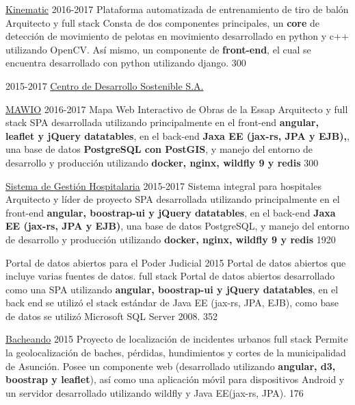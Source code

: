 \documentclass[]{friggeri-cv}
\begin{document}
\begin{entrylist}
{    \proyecto
        {\href{http://www.cds.com.py/productos/kinematics/}{Kinematic}}
        {2016-2017}
        {Plataforma automatizada de entrenamiento de tiro de balón}
        {Arquitecto y full stack}
        {Consta de dos componentes principales, un \textbf{core} de detección de movimiento de pelotas en movimiento desarrollado en python y c++ utilizando OpenCV. Así mismo, un componente de \textbf{front-end}, el cual se encuentra desarrollado con python utilizando django.}
        {300}
        
        
        
      }
      {}
   
  \entry
    {2015-2017}
    {\href{http://www.cds.com.py}{Centro de Desarrollo Sostenible S.A.}}
    {}
    {
    \proyecto
        {\href{https://mawio.net/}{MAWIO}}
        {2016-2017}
        {Mapa Web Interactivo de Obras de la Essap}
        {Arquitecto y full stack}
        {SPA desarrollada utilizando principalmente en el front-end \textbf{angular, leaflet y jQuery datatables}, en el back-end \textbf{Jaxa EE (jax-rs, JPA y EJB),}, una base de datos \textbf{PostgreSQL con PostGIS}, y manejo del entorno de desarrollo y producción utilizando \textbf{docker, nginx, wildfly 9 y redis}}
        {300}
        
    \proyecto
        {\href{http://www.cds.com.py/productos/sistemas-de-gestion/sistema-de-gestion-hospitalaria/}{Sistema de Gestión Hospitalaria}}
        {2015-2017}
        {Sistema integral para hospitales}
        {Arquitecto y líder de proyecto}
        {SPA desarrollada utilizando principalmente en el front-end 
        \textbf{angular, boostrap-ui y jQuery datatables}, en el back-end 
        \textbf{Jaxa EE (jax-rs, JPA y EJB)}, una base de datos PostgreSQL, 
        y manejo del entorno de desarrollo y producción utilizando 
        \textbf{docker, nginx, wildfly 9 y redis}}
        {1920}
        
    \proyecto
        {Portal de datos abiertos para el Poder Judicial}
        {2015}
        {Portal de datos abiertos que incluye varias fuentes de datos.}
        {full stack}
        {Portal de datos abiertos desarrollado como una SPA utilizando 
        \textbf{angular, boostrap-ui y jQuery datatables}, en el back end 
        se utilizó el stack estándar de Java EE (jax-rs, JPA, EJB), como base 
        de datos se utilizó Microsoft SQL Server 2008.}
        {352} 
        
    \proyecto
        {\href{http://bacheando.com/}{Bacheando}}
        {2015}
        {Proyecto de localización de incidentes urbanos}
        {full stack}
        {Permite la geolocalización de baches, pérdidas, hundimientos y
            cortes de la municipalidad de Asunción.
            Posee un componente web (desarrollado utilizando 
            \textbf{angular, d3, boostrap y leaflet}), así como una 
            aplicación móvil para dispositivos Android y un servidor desarrollado 
            utilizando wildfly y Java EE(jax-rs, JPA).}
        {176} 
        
}
\end{entrylist}
\end{document}
